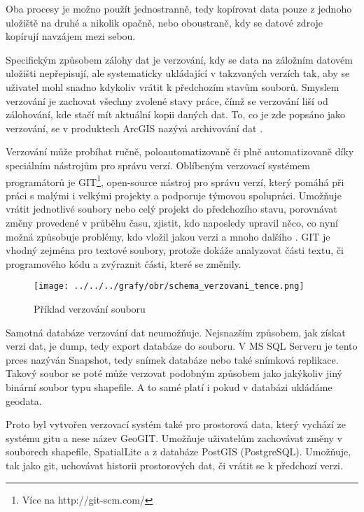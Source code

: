         Oba procesy je možno použít jednostranně, tedy kopírovat data pouze z jednoho
        uložiště na druhé a nikolik opačně, nebo oboustraně, kdy se datové zdroje
        kopírují navzájem mezi sebou.

        Specifickým způsobem zálohy dat je verzování, kdy se data na záložním datovém
        uložišti nepřepisují, ale systematicky ukládající v takzvaných verzích tak, aby
        se uživatel mohl snadno kdykoliv vrátit k předchozím stavům souborů. Smyslem
        verzování je zachovat všechny zvolené stavy práce, čímž se verzování liší od
        zálohování, kde stačí mít aktuální kopii daných dat. To, co je zde popsáno jako
        verzování, se v produktech ArcGIS nazývá archivování dat \citep{Law2008}. 

        Verzování může probíhat ručně, poloautomatizovaně či plně automatizovaně díky
        speciálním nástrojům pro správu verzí. Oblíbeným verzovací systémem
        programátorů je GIT\footnote{Více na http://git-scm.com/}, open-source nástroj
        pro správu verzí, který pomáhá při práci s malými i velkými projekty a
        podporuje týmovou spolupráci. Umožňuje vrátit jednotlivé soubory nebo celý
        projekt do předchozího stavu, porovnávat změny provedené v průběhu času,
        zjistit, kdo naposledy upravil něco, co nyní možná způsobuje problémy, kdo
        vložil jakou verzi a mnoho dalšího \citep{Chacon2009}. GIT je vhodný zejména
        pro textové soubory, protože dokáže analyzovat části textu, či programového
        kódu a zvýraznit části, které se změnily.
        
          \begin{figure}[H]
            \centering
            \texttt{[image: ../../../grafy/obr/schema\_verzovani\_tence.png]}
            \caption {Příklad verzování souboru}
          \end{figure}

        Samotná databáze verzování dat neumožňuje. Nejsnazším způsobem, jak získat
        verzi dat, je dump, tedy export databáze do souboru. V MS SQL Serveru je tento
        prces nazýván Snapshot, tedy snímek databáze nebo také snímková replikace.
        Takový soubor se poté může verzovat podobným způsobem jako jakýkoliv jiný
        binární soubor typu shapefile. A to samé platí i pokud v databázi ukládáme
        geodata. 

        Proto byl vytvořen verzovací systém také pro prostorová data, který vychází ze
        systému gitu a nese název GeoGIT. Umožňuje uživatelům zachovávat změny v
        souborech shapefile, SpatialLite a z databáze PostGIS (PostgreSQL). Umožňuje,
        tak jako git, uchovávat historii prostorových dat, či vrátit se k předchozí
        verzi. 

